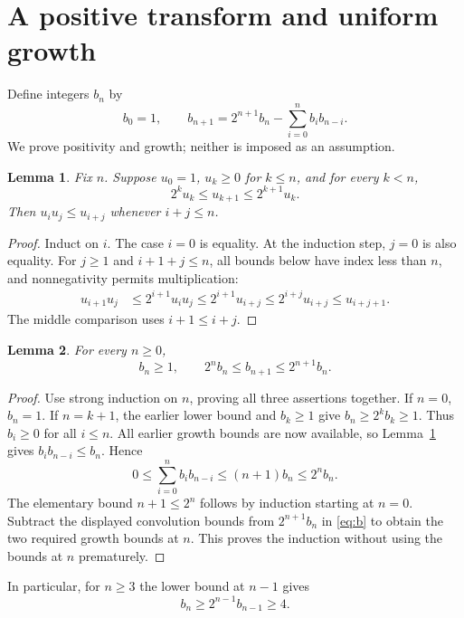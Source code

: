 \documentclass[11pt]{article}
\newtheorem{lemma}{Lemma}
\begin{document}
\newpage
\section{A positive transform and uniform growth}
Define integers $b_n$ by
\begin{equation}\label{eq:b}
 b_0=1,\qquad b_{n+1}=2^{n+1}b_n-\sum_{i=0}^{n}b_i b_{n-i}.
\end{equation}
We prove positivity and growth; neither is imposed as an assumption.

\begin{lemma}\label{lem:product}
Fix $n$. Suppose $u_0=1$, $u_k\ge0$ for $k\le n$, and for every $k<n$,
\[
 2^k u_k\le u_{k+1}\le2^{k+1}u_k.
\]
Then $u_i u_j\le u_{i+j}$ whenever $i+j\le n$.
\end{lemma}
\begin{proof}
Induct on $i$. The case $i=0$ is equality. At the induction step,
$j=0$ is also equality. For $j\ge1$ and $i+1+j\le n$, all bounds below
have index less than $n$, and nonnegativity permits multiplication:
\begin{align*}
 u_{i+1}u_j
 &\le2^{i+1}u_i u_j
 \le2^{i+1}u_{i+j}
 \le2^{i+j}u_{i+j}
 \le u_{i+j+1}.
\end{align*}
The middle comparison uses $i+1\le i+j$.
\end{proof}

\begin{lemma}\label{lem:growth}
For every $n\ge0$,
\begin{equation}\label{eq:growth}
 b_n\ge1,\qquad 2^n b_n\le b_{n+1}\le2^{n+1}b_n.
\end{equation}
\end{lemma}
\begin{proof}
Use strong induction on $n$, proving all three assertions together.
If $n=0$, $b_n=1$. If $n=k+1$, the earlier lower bound and
$b_k\ge1$ give $b_n\ge2^k b_k\ge1$. Thus $b_i\ge0$ for all $i\le n$.
All earlier growth bounds are now available, so Lemma~\ref{lem:product}
gives $b_i b_{n-i}\le b_n$. Hence
\[
 0\le\sum_{i=0}^{n}b_i b_{n-i}\le(n+1)b_n\le2^n b_n.
\]
The elementary bound $n+1\le2^n$ follows by induction starting at $n=0$.
Subtract the displayed convolution bounds from $2^{n+1}b_n$ in
\eqref{eq:b} to obtain the two required growth bounds at $n$.
This proves the induction without using the bounds at $n$ prematurely.
\end{proof}

In particular, for $n\ge3$ the lower bound at $n-1$ gives
\begin{equation}\label{eq:large}
 b_n\ge2^{n-1}b_{n-1}\ge4.
\end{equation}
\end{document}
